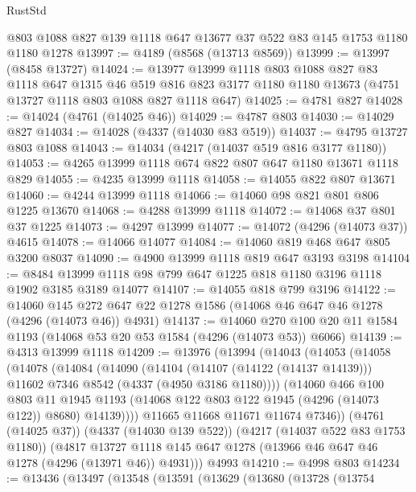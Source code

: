 \begin{lexlean}{RustStd}
\begin{coremodule}
    @803
    @1088
    @827
    @139
    @1118
    @647
    @13677
    @37
    @522
    @83
    @145
    @1753
    @1180
    @1180
    @1278
@13997 := @4189 (@8568 (@13713 @8569))
@13999 := @13997 (@8458 @13727)
@14024 := @13977
    @13999
    @1118
    @803
    @1088
    @827
    @83
    @1118
    @647
    @1315
    @46
    @519
    @816
    @823
    @3177
    @1180
    @1180
    @13673
    (@4751 @13727 @1118 @803 @1088 @827 @1118 @647)
@14025 := @4781 @827
@14028 := @14024 (@4761 (@14025 @46))
@14029 := @4787 @803
@14030 := @14029 @827
@14034 := @14028 (@4337 (@14030 @83 @519))
@14037 := @4795 @13727 @803 @1088
@14043 := @14034 (@4217 (@14037 @519 @816 @3177 @1180))
@14053 := @4265 @13999 @1118 @674 @822 @807 @647 @1180 @13671 @1118 @829
@14055 := @4235 @13999 @1118
@14058 := @14055 @822 @807 @13671
@14060 := @4244 @13999 @1118
@14066 := @14060 @98 @821 @801 @806 @1225 @13670
@14068 := @4288 @13999 @1118
@14072 := @14068 @37 @801 @37 @1225
@14073 := @4297 @13999
@14077 := @14072 (@4296 (@14073 @37)) @4615
@14078 := @14066 @14077
@14084 := @14060 @819 @468 @647 @805 @3200 @8037
@14090 := @4900 @13999 @1118 @819 @647 @3193 @3198
@14104 := @8484 @13999 @1118 @98 @799 @647 @1225 @818 @1180 @3196 @1118 @1902 @3185 @3189 @14077
@14107 := @14055 @818 @799 @3196
@14122 := @14060
    @145
    @272
    @647
    @22
    @1278
    @1586
    (@14068 @46 @647 @46 @1278 (@4296 (@14073 @46)) @4931)
@14137 := @14060 @270 @100 @20 @11 @1584 @1193 (@14068 @53 @20 @53 @1584 (@4296 (@14073 @53)) @6066)
@14139 := @4313 @13999 @1118
@14209 := @13976
    (@13994
      (@14043
        (@14053
          (@14058
            (@14078
              (@14084
                (@14090
                  (@14104
                    (@14107 (@14122 (@14137 @14139)))
                    @11602
                    @7346
                    @8542
                    (@4337 (@4950 @3186 @1180))))
                (@14060
                  @466
                  @100
                  @803
                  @11
                  @1945
                  @1193
                  (@14068 @122 @803 @122 @1945 (@4296 (@14073 @122)) @8680)
                  @14139))))
          @11665
          @11668
          @11671
          @11674
          @7346))
      (@4761 (@14025 @37))
      (@4337 (@14030 @139 @522))
      (@4217 (@14037 @522 @83 @1753 @1180))
      (@4817 @13727 @1118 @145 @647 @1278 (@13966 @46 @647 @46 @1278 (@4296 (@13971 @46)) @4931)))
    @4993
@14210 := @4998 @803
@14234 := @13436
    (@13497
      (@13548
        (@13591
          (@13629
            (@13680
              (@13728
                (@13754

\end{coremodule}
\end{lexlean}
